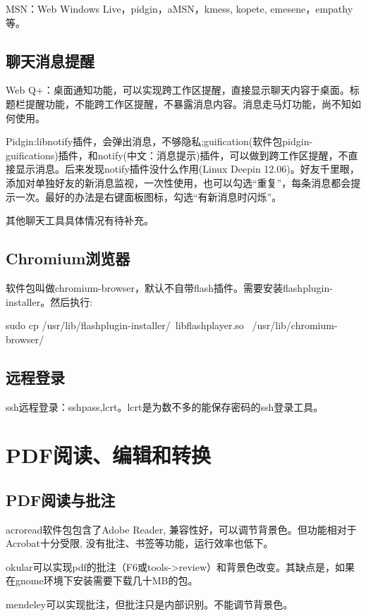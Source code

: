 MSN：Web Windows Live，pidgin，aMSN，kmess, kopete, emesene，empathy等。

\subsection{聊天消息提醒}
Web Q+：桌面通知功能，可以实现跨工作区提醒，直接显示聊天内容于桌面。标题栏提醒功能，不能跨工作区提醒，不暴露消息内容。消息走马灯功能，尚不知如何使用。

Pidgin:libnotify插件，会弹出消息，不够隐私;guification(软件包pidgin-guifications)插件，和notify(中文：消息提示)插件，可以做到跨工作区提醒，不直接显示消息。后来发现notify插件没什么作用(Linux Deepin 12.06)。好友千里眼，添加对单独好友的新消息监视，一次性使用，也可以勾选“重复”，每条消息都会提示一次。最好的办法是右键面板图标，勾选“有新消息时闪烁”。

其他聊天工具具体情况有待补充。

\subsection{Chromium浏览器}
软件包叫做chromium-browser，默认不自带flash插件。需要安装flashplugin-installer。然后执行:
\begin{shellcmd}
    sudo cp /usr/lib/flashplugin-installer/\
    libflashplayer.so \ 
    /usr/lib/chromium-browser/
\end{shellcmd}

\subsection{远程登录}
ssh远程登录：sshpass,lcrt。lcrt是为数不多的能保存密码的ssh登录工具。

\section{PDF阅读、编辑和转换}

\subsection{PDF阅读与批注}
acroread软件包包含了Adobe Reader, 兼容性好，可以调节背景色。但功能相对于Acrobat十分受限, 没有批注、书签等功能，运行效率也低下。

okular可以实现pdf的批注（F6或tools->review）和背景色改变。其缺点是，如果在gnome环境下安装需要下载几十MB的包。

mendeley可以实现批注，但批注只是内部识别。不能调节背景色。

